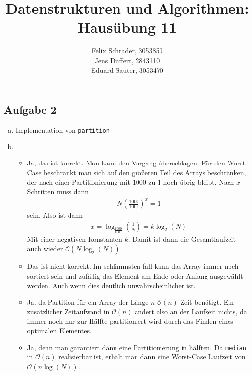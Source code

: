 \documentclass[11pt]{article}
\author{
  Felix Schrader, 3053850 \\ 
  Jens Duffert, 2843110 \\
  Eduard Sauter, 3053470
}
\title{Datenstrukturen und Algorithmen: Haus\"ubung 11}
\begin{document}
\maketitle
\subsection*{Aufgabe 2}
\begin{enumerate}[a)]
  \item Implementation von \texttt{partition}
    
  \item
    \begin{itemize}
      \item Ja, das ist korrekt. Man kann den Vorgang überschlagen.
        Für den Worst-Case beschränkt man sich auf den größeren Teil des
        Arrays beschränken, der nach einer Partitionierung mit
        1000 zu 1 noch übrig bleibt. Nach $x$ Schritten muss dann
        \begin{align*}
          N \left( \frac{1000}{1001} \right)^x = 1
        \end{align*}
        sein.
        Also ist dann
        \begin{align*}
          x = \log_{\frac{1000}{1001}} (\frac{1}{N}) =  k \log_2(N)
        \end{align*}
        Mit einer negativen Konstanten $k$. Damit ist dann die Gesamtlaufzeit auch
        wieder $\mathcal{O}(N \log_2(N))$.

      \item Das ist nicht korrekt. Im schlimmsten fall kann das Array immer
        noch sortiert sein und zufällig das Element am Ende oder Anfang ausgewählt
        werden. Auch wenn dies deutlich unwahrscheinlicher ist.

      \item Ja, da Partition für ein Array der Länge $n$ $\mathcal{O}(n)$
        Zeit benötigt. Ein zusätzlicher Zeitaufwand in $\mathcal{O}(n)$ ändert
        also an der Laufzeit nichts, da immer noch nur zur Hälfte partitioniert
        wird durch das Finden eines optimalen Elementes.

      \item Ja, denn man garantiert dann eine Partitionierung in hälften.
        Da \texttt{median} in $\mathcal{O}(n)$ realisierbar ist, erhält man
        dann eine Worst-Case Laufzeit von $\mathcal{O}(n \log(N))$.

    \end{itemize}
\end{enumerate} 
\end{document}
